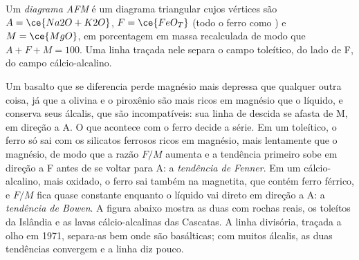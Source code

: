 \begin{definition}\label{def:b2:magmatic-series:afm}
Um \emph{diagrama AFM} é um diagrama triangular cujos vértices são
$A = \ce{Na2O + K2O}$, $F = \ce{FeO_T}$ (todo o ferro como ) e $M = \ce{MgO}$, em
porcentagem em massa recalculada de modo que $A + F + M = 100$. Uma linha traçada nele separa o
campo toleítico, do lado de F, do campo cálcio-alcalino.
\end{definition}

Um basalto que se diferencia perde magnésio mais depressa que qualquer outra coisa, já que a olivina e o
piroxênio são mais ricos em magnésio que o líquido, e conserva seus álcalis, que são
incompatíveis: sua linha de descida se afasta de M, em direção a A. O que acontece com o
ferro decide a série. Em um  toleítico, o ferro só sai com os
silicatos ferrosos ricos em magnésio, mais lentamente que o magnésio, de modo que a razão
$F/M$ aumenta e a tendência primeiro sobe em direção a F antes de se voltar para A: a
\emph{tendência de Fenner}. Em um  cálcio-alcalino, mais oxidado, o ferro sai também na
magnetita, que contém ferro férrico, e $F/M$ fica quase constante enquanto o líquido
vai direto em direção a A: a \emph{tendência de Bowen}. A figura abaixo mostra as duas com
rochas reais, os toleítos da Islândia e as lavas cálcio-alcalinas das Cascatas. A
linha divisória, traçada a olho em 1971, separa-as bem onde são basálticas; com
muitos álcalis, as duas tendências convergem e a linha diz pouco.

